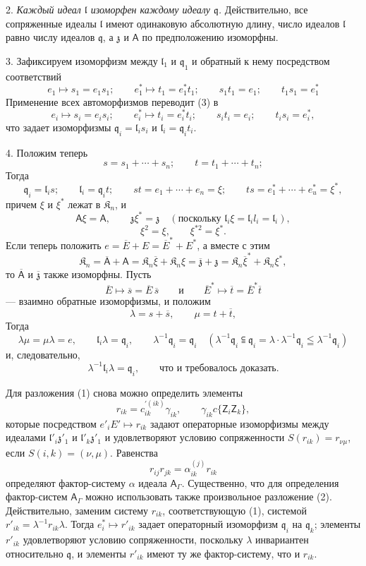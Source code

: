 \documentclass[11pt]{article}
\begin{document}
2. \emph{Каждый идеал \(\mathfrak l\) изоморфен каждому идеалу \(\mathfrak q\).} Действительно, все сопряженные идеалы \(\mathfrak l\) имеют одинаковую абсолютную длину, число идеалов \(\mathfrak l\) равно числу идеалов \(\mathfrak q\), а \(\mathfrak z\) и \(\mathsf{A}\) по предположению изоморфны.

3. Зафиксируем изоморфизм между \(\mathfrak l_1\) и \(\mathfrak q_1\) и обратный к нему посредством соответствий
\[
\tag{3}
e_1\mapsto s_1=e_1s_1;\qquad
e_1^*\mapsto t_1=e_1^*t_1;\qquad
s_1t_1=e_1;\qquad
t_1s_1=e_1^*
\]
Применение всех автоморфизмов переводит (3) в
\[
e_i\mapsto s_i=e_is_i;\qquad
e_i^*\mapsto t_i=e_i^*t_i;\qquad
s_it_i=e_i;\qquad
t_is_i=e_i^*,
\]
что задает изоморфизмы \(\mathfrak q_i=\mathfrak l_is_i\) и \(\mathfrak l_i=\mathfrak q_it_i\).

4. Положим теперь
\[
s=s_1+\cdots+s_n;\qquad t=t_1+\cdots+t_n;
\]
Тогда
\[
\mathfrak q_i=\mathfrak l_is;\qquad
\mathfrak l_i=\mathfrak q_it;\qquad
st=e_1+\cdots+e_n=\xi;\qquad
ts=e_1^*+\cdots+e_u^*=\xi^*,
\]
причем \(\xi\) и \(\xi^*\) лежат в \(\mathfrak K_n\), и
\[
\mathsf{A}\xi=\mathsf{A},\qquad \mathfrak z\xi^*=\mathfrak z\quad
(\text{поскольку }\mathfrak l_i\xi=\mathfrak l_il_i=\mathfrak l_i),
\]
\[
\xi^2=\xi,\qquad \xi^{*2}=\xi^*.
\]
Если теперь положить \(e=\overline E+E=\overline E^*+E^*\), а вместе с этим
\[
\mathfrak K_n=\overline{\mathsf A}+\mathsf{A}
=\mathfrak K_n\overline\xi+\mathfrak K_n\xi
=\overline{\mathfrak z}+\mathfrak z
=\mathfrak K_n\overline\xi^*+\mathfrak K_n\xi^*,
\]
то \(\overline{\mathsf A}\) и \(\overline{\mathfrak z}\) также изоморфны. Пусть
\[
\overline E\mapsto\overline s=\overline E\,\overline s
\qquad\text{и}\qquad
\overline E^*\mapsto\overline t=\overline E^*\overline t
\]
--- взаимно обратные изоморфизмы, и положим
\[
\lambda=s+\overline s,\qquad \mu=t+\overline t,
\]
Тогда
\[
\lambda\mu=\mu\lambda=e,\qquad
\mathfrak l_i\lambda=\mathfrak q_i,\qquad
\lambda^{-1}\mathfrak q_i=\mathfrak q_i
\quad
(\lambda^{-1}\mathfrak q_i\subseteqq\mathfrak q_i
=\lambda\cdot\lambda^{-1}\mathfrak q_i\leqq\lambda^{-1}\mathfrak q_i)
\]
и, следовательно,
\[
\lambda^{-1}\mathfrak l_i\lambda=\mathfrak q_i,\qquad \text{что и требовалось доказать.}
\]

Для разложения (1) снова можно определить элементы
\[
r_{ik}=c_{ik}^{\prime(ik)}\gamma_{ik},\qquad \gamma_{ik}c\{\mathsf{Z}_i\mathsf{Z}_k\},
\]
которые посредством \(e'_iE'\mapsto r_{ik}\) задают операторные изоморфизмы между идеалами \(\mathfrak l'_i\mathfrak z'_1\) и \(\mathfrak l'_k\mathfrak z'_1\) и удовлетворяют условию сопряженности \(S(r_{ik})=r_{\nu\mu}\), если \(S(i,k)=(\nu,\mu)\). Равенства
\[
r_{ij}r_{jk}=\alpha_{ik}^{(j)}r_{ik}
\]
определяют фактор-систему \(\alpha\) идеала \(\mathsf{A}_\Gamma\). Существенно, что для определения фактор-систем \(\mathsf{A}_\Gamma\) можно использовать также произвольное разложение (2). Действительно, заменим систему \(r_{ik}\), соответствующую (1), системой \(r'_{ik}=\lambda^{-1}r_{ik}\lambda\). Тогда \(e_i^*\mapsto r'_{ik}\) задает операторный изоморфизм \(\mathfrak q_i\) на \(\mathfrak q_k\); элементы \(r'_{ik}\) удовлетворяют условию сопряженности, поскольку \(\lambda\) инвариантен относительно \(\mathfrak q\), и элементы \(r'_{ik}\) имеют ту же фактор-систему, что и \(r_{ik}\).
\end{document}
